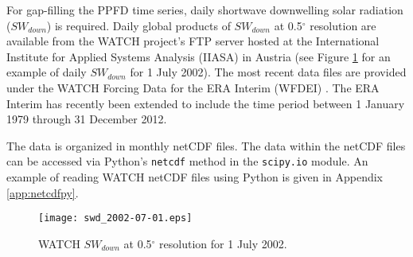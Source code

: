 For gap-filling the PPFD time series, daily shortwave downwelling solar radiation ($SW_{down}$) is required.  
Daily global products of $SW_{down}$ at 0.5$^{\circ}$ resolution are available from the WATCH project's FTP server hosted at the International Institute for Applied Systems Analysis (IIASA) in Austria\footnotemark {} (see Figure \ref{fig:watchswd} for an example of daily $SW_{down}$ for 1 July 2002).  
The most recent data files are provided under the WATCH Forcing Data for the ERA Interim (WFDEI) \parencite{weedon12}.  
The ERA Interim has recently been extended to include the time period between 1 January 1979 through 31 December 2012.

The data is organized in monthly netCDF files.  
The data within the netCDF files can be accessed via Python's \texttt{netcdf} method in the \texttt{scipy.io} module.  
An example of reading WATCH netCDF files using Python is given in Appendix \ref{app:netcdfpy}.
\begin{figure}[h!]
    \texttt{[image: swd\_2002-07-01.eps]}
    \caption{WATCH $SW_{down}$ at 0.5$^{\circ}$ resolution for 1 July 
    2002.}
    \label{fig:watchswd}
\end{figure}

